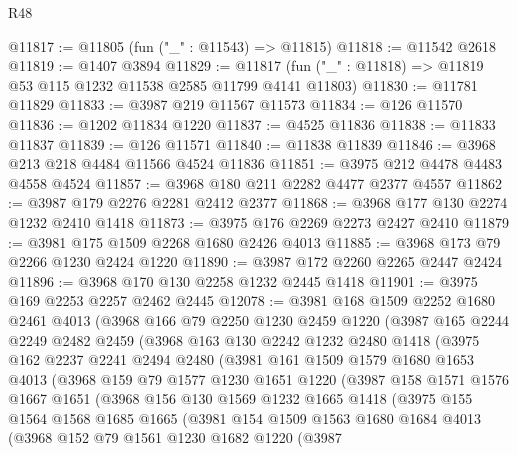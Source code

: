 \begin{lexlean}{R48}
\begin{coremodule}
@11817 := @11805 (fun ("_" : @11543) => @11815)
@11818 := @11542 @2618
@11819 := @1407 @3894
@11829 := @11817 (fun ("_" : @11818) => @11819 @53 @115 @1232 @11538 @2585 @11799 @4141 @11803)
@11830 := @11781 @11829
@11833 := @3987 @219 @11567 @11573
@11834 := @126 @11570
@11836 := @1202 @11834 @1220
@11837 := @4525 @11836
@11838 := @11833 @11837
@11839 := @126 @11571
@11840 := @11838 @11839
@11846 := @3968 @213 @218 @4484 @11566 @4524 @11836
@11851 := @3975 @212 @4478 @4483 @4558 @4524
@11857 := @3968 @180 @211 @2282 @4477 @2377 @4557
@11862 := @3987 @179 @2276 @2281 @2412 @2377
@11868 := @3968 @177 @130 @2274 @1232 @2410 @1418
@11873 := @3975 @176 @2269 @2273 @2427 @2410
@11879 := @3981 @175 @1509 @2268 @1680 @2426 @4013
@11885 := @3968 @173 @79 @2266 @1230 @2424 @1220
@11890 := @3987 @172 @2260 @2265 @2447 @2424
@11896 := @3968 @170 @130 @2258 @1232 @2445 @1418
@11901 := @3975 @169 @2253 @2257 @2462 @2445
@12078 := @3981
    @168
    @1509
    @2252
    @1680
    @2461
    @4013
    (@3968
      @166
      @79
      @2250
      @1230
      @2459
      @1220
      (@3987
        @165
        @2244
        @2249
        @2482
        @2459
        (@3968
          @163
          @130
          @2242
          @1232
          @2480
          @1418
          (@3975
            @162
            @2237
            @2241
            @2494
            @2480
            (@3981
              @161
              @1509
              @1579
              @1680
              @1653
              @4013
              (@3968
                @159
                @79
                @1577
                @1230
                @1651
                @1220
                (@3987
                  @158
                  @1571
                  @1576
                  @1667
                  @1651
                  (@3968
                    @156
                    @130
                    @1569
                    @1232
                    @1665
                    @1418
                    (@3975
                      @155
                      @1564
                      @1568
                      @1685
                      @1665
                      (@3981
                        @154
                        @1509
                        @1563
                        @1680
                        @1684
                        @4013
                        (@3968
                          @152
                          @79
                          @1561
                          @1230
                          @1682
                          @1220
                          (@3987

\end{coremodule}
\end{lexlean}
